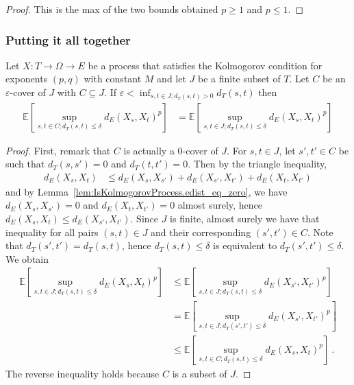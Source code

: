 \begin{proof}
This is the max of the two bounds obtained $p \ge 1$ and $p \le 1$.
\end{proof}



\subsubsection{Putting it all together}


\begin{lemma}\label{lem:lintegral_sup_cover_eq_of_lt_iInf_dist}
  \leanok
Let $X : T \to \Omega \to E$ be a process that satisfies the Kolmogorov condition for exponents $(p,q)$ with constant $M$ and let $J$ be a finite subset of $T$.
Let $C$ be an $\varepsilon$-cover of $J$ with $C \subseteq J$.
If $\varepsilon < \inf_{s, t \in J; d_T(s, t)>0} d_T(s, t)$ then
\begin{align*}
  \mathbb{E}\left[ \sup_{s, t \in C; d_T(s, t) \le \delta} d_E(X_s, X_t)^p \right]
  &= \mathbb{E}\left[ \sup_{s, t \in J; d_T(s, t) \le \delta} d_E(X_s, X_t)^p \right]
\end{align*}
\end{lemma}

\begin{proof}
First, remark that $C$ is actually a $0$-cover of $J$.
For $s, t \in J$, let $s', t' \in C$ be such that $d_T(s, s') = 0$ and $d_T(t, t') = 0$.
Then by the triangle inequality,
\begin{align*}
  d_E(X_s, X_t)
  &\le d_E(X_s, X_{s'}) + d_E(X_{s'}, X_{t'}) + d_E(X_t, X_{t'})
\end{align*}
and by Lemma~\ref{lem:IsKolmogorovProcess.edist_eq_zero}, we have $d_E(X_s, X_{s'}) = 0$ and $d_E(X_t, X_{t'}) = 0$ almost surely, hence $d_E(X_s, X_t) \le d_E(X_{s'}, X_{t'})$.
Since $J$ is finite, almost surely we have that inequality for all pairs $(s, t) \in J$ and their corresponding $(s', t') \in C$.
Note that $d_T(s', t') = d_T(s, t)$, hence $d_T(s, t) \le \delta$ is equivalent to $d_T(s', t') \le \delta$.
We obtain
\begin{align*}
  \mathbb{E}\left[ \sup_{s, t \in J; d_T(s, t) \le \delta} d_E(X_s, X_t)^p \right]
  &\le \mathbb{E}\left[ \sup_{s, t \in J; d_T(s, t) \le \delta} d_E(X_{s'}, X_{t'})^p \right]
  \\
  &= \mathbb{E}\left[ \sup_{s, t \in J; d_T(s', t') \le \delta} d_E(X_{s'}, X_{t'})^p \right]
  \\
  &\le \mathbb{E}\left[ \sup_{s, t \in C; d_T(s, t) \le \delta} d_E(X_s, X_t)^p \right]
  \: .
\end{align*}
The reverse inequality holds because $C$ is a subset of $J$.
\end{proof}


